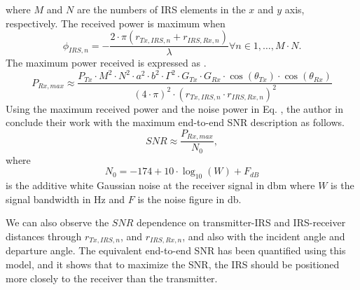 where $M$ and $N$ are the numbers of IRS elements in the $x$ and $y$ axis, respectively. The received power is maximum when 
\begin{equation}
	\phi_{IRS, n}= - \frac{2 \cdot \pi \left( r_{Tx, IRS, n}+ r_{IRS, Rx, n} \right)}{\lambda} \forall n \in 1, \dots, M \cdot N .
\end{equation}
The maximum power received is expressed as .
\begin{equation} \label{Eq:model2 maximum power received}
	P_{Rx, max} \approx \frac{P_{Tx} \cdot M^2 \cdot N^2 \cdot a^2 \cdot b^2  \cdot \Gamma^2 \cdot G_{Tx} \cdot G_{Rx} \cdot \cos(\theta_{Tx}) \cdot \cos(\theta_{Rx})}{(4 \cdot \pi)^2 \cdot  \left( r_{Tx,IRS, n} \cdot r_{IRS,Rx, n} \right)^2}
\end{equation}
Using the maximum received power and the noise power in Eq. , the author in \cite{ntontin2021optimal} conclude their work with the maximum end-to-end SNR description as follows.
\begin{equation} \label{Eq:model2 SNR}
	SNR \approx \frac{P_{Rx, max}}{N_0},
\end{equation}
where
\begin{equation} \label{Eq:model2 No}
	N_0 = -174 + 10 \cdot \log_{10} (W) + F_{dB}
\end{equation}
is the additive white Gaussian noise at the receiver signal in \si{\decibel}m where $W$ is the signal bandwidth in \si{\hertz} and $F$ is the noise figure in \si{\decibel}.

We can also observe the $SNR$ dependence on transmitter-\ac{IRS} and \ac{IRS}-receiver distances through $r_{Tx, IRS, n}$, and $r_{IRS, Rx, n}$, and also with the incident angle and departure angle. The equivalent end-to-end \ac{SNR} has been quantified using this model, and it shows that to maximize the \ac{SNR}, the \ac{IRS} should be positioned more closely to the receiver than the transmitter.
